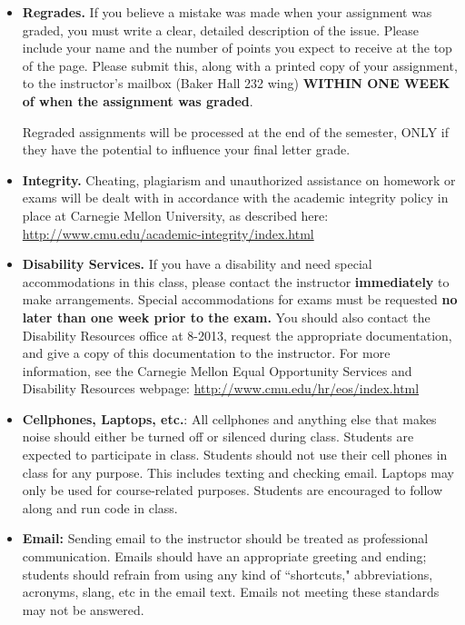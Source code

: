 \documentclass[11pt]{article}
\begin{document}
\begin{itemize}
\item {\bf Regrades.}  If you believe a mistake was made when your assignment was graded, you must write a clear, detailed description of the issue.  Please include your name and the number of points you expect to receive at the top of the page.  Please submit this, along with a printed copy of your assignment, to the instructor's mailbox (Baker Hall 232 wing) \textbf{WITHIN ONE WEEK of when the assignment was graded}.  

Regraded assignments will be processed at the end of the semester, ONLY if they have the potential to influence your final letter grade.


\item {\bf Integrity.} Cheating, plagiarism and unauthorized assistance on homework or exams will be dealt with in accordance with the academic integrity policy in place at Carnegie Mellon University, as described here:  \url{http://www.cmu.edu/academic-integrity/index.html}

\item {\bf Disability Services.}  If you have a disability and need special accommodations in this class, please contact the instructor {\bf immediately} to make arrangements.  Special accommodations for exams must be requested {\bf no later than one week prior to the exam.}  You should also contact the Disability Resources office at 8-2013, request the appropriate documentation, and give a copy of this documentation to the instructor.  For more information, see the Carnegie Mellon Equal Opportunity Services and Disability Resources webpage:  \url{http://www.cmu.edu/hr/eos/index.html}


\item {\bf Cellphones, Laptops, etc.}:  All cellphones and anything else that makes noise should either be turned off or silenced during class.  Students are expected to participate in class.  Students should not use their cell phones in class for any purpose.  This includes texting and checking email.  Laptops may only be used for course-related purposes.  Students are encouraged to follow along and run code in class.

\item {\bf Email:}  Sending email to the instructor should be treated as professional communication.  Emails should have an appropriate greeting and ending; students should refrain from using any kind of ``shortcuts," abbreviations, acronyms, slang, etc in the email text.  Emails not meeting these standards may not be answered.


\end{itemize}
\end{document}
